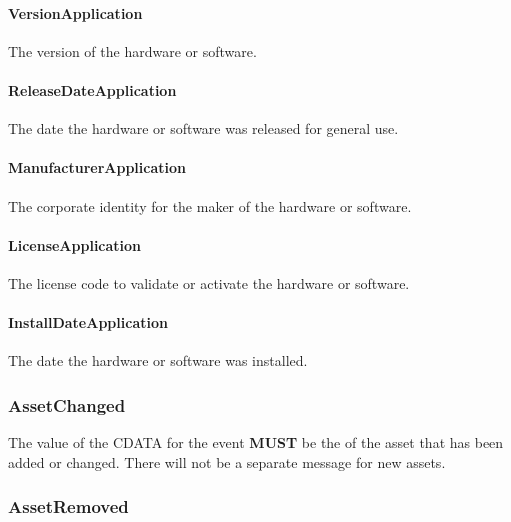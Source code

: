 \paragraph{VersionApplication}\mbox{}
\label{sec:VersionApplication}


The version of the hardware or software.


\paragraph{ReleaseDateApplication}\mbox{}
\label{sec:ReleaseDateApplication}


The date the hardware or software was released for general use.



\paragraph{ManufacturerApplication}\mbox{}
\label{sec:ManufacturerApplication}


The corporate identity for the maker of the hardware or software.



\paragraph{LicenseApplication}\mbox{}
\label{sec:LicenseApplication}


The license code to validate or activate the hardware or software.


\paragraph{InstallDateApplication}\mbox{}
\label{sec:InstallDateApplication}


The date the hardware or software was installed.


\subsubsection{AssetChanged}
\label{sec:AssetChanged}



The value of the \gls{CDATA} for the event \textbf{MUST} be the  of the asset that has been added or changed. There will not be a separate message for new assets.


\subsubsection{AssetRemoved}
\label{sec:AssetRemoved}



